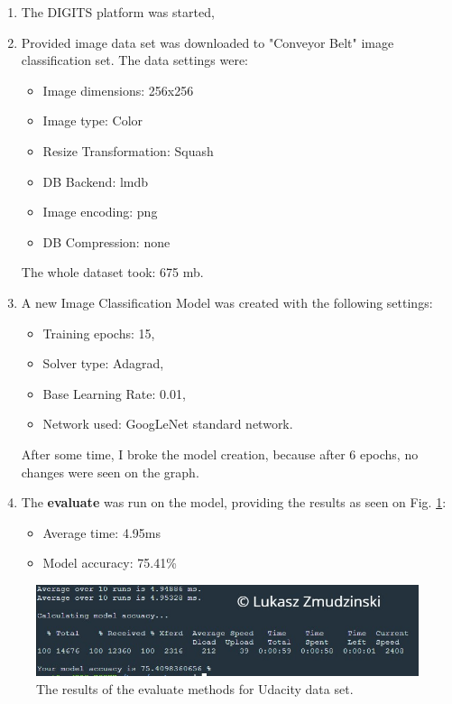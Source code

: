 \documentclass[10pt,journal,compsoc]{IEEEtran}
\begin{document}
    \begin{enumerate}
        \item The DIGITS platform was started,
        \item {
            Provided image data set was downloaded to "Conveyor Belt" image classification set. The data settings were:
            \begin{itemize}
                \item Image dimensions: 256x256
                \item Image type: Color
                \item Resize Transformation: Squash
                \item DB Backend: lmdb
                \item Image encoding: png
                \item DB Compression: none
            \end{itemize}
            The whole dataset took: 675 mb.
        }
        \item {
            A new Image Classification Model was created with the following settings:
            \begin{itemize}
                \item Training epochs: 15,
                \item Solver type: Adagrad,
                \item Base Learning Rate: 0.01,
                \item Network used: GoogLeNet standard network.
            \end{itemize}
            After some time, I broke the model creation, because after 6 epochs, no changes were seen on the graph.
        }
        \item {
            The \textbf{evaluate} was run on the model, providing the results as seen on Fig. \ref{fig:udacity}:
            \begin{itemize}
                \item Average time: 4.95ms
                \item Model accuracy: 75.41\%
            \end{itemize}
        }
    \end{enumerate}

    \begin{figure}[h!]
        \includegraphics[width=\linewidth]{udacity.png}
        \caption{The results of the evaluate methods for Udacity data set.}
        \label{fig:udacity}
        \centering
    \end{figure}
\newpage
\end{document}
